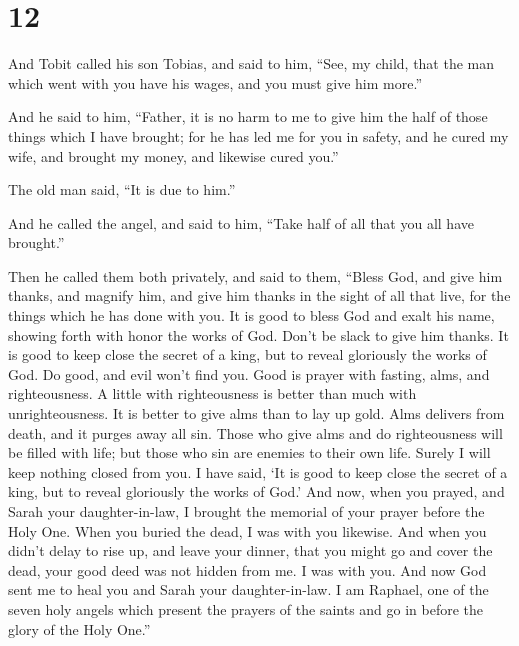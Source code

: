 \hypertarget{section-11}{%
\section{12}\label{section-11}}

 And Tobit called his son Tobias, and said to him, ``See, my
child, that the man which went with you have his wages, and you must
give him more.''

 And he said to him, ``Father, it is no harm to me to give
him the half of those things which I have brought;  for he
has led me for you in safety, and he cured my wife, and brought my
money, and likewise cured you.''

 The old man said, ``It is due to him.''

 And he called the angel, and said to him, ``Take half of
all that you all have brought.''

 Then he called them both privately, and said to them,
``Bless God, and give him thanks, and magnify him, and give him thanks
in the sight of all that live, for the things which he has done with
you. It is good to bless God and exalt his name, showing forth with
honor the works of God. Don't be slack to give him thanks. 
It is good to keep close the secret of a king, but to reveal gloriously
the works of God. Do good, and evil won't find you.  Good is
prayer with fasting, alms, and righteousness. A little with
righteousness is better than much with unrighteousness. It is better to
give alms than to lay up gold.  Alms delivers from death,
and it purges away all sin. Those who give alms and do righteousness
will be filled with life;  but those who sin are enemies to
their own life.  Surely I will keep nothing closed from
you. I have said, `It is good to keep close the secret of a king, but to
reveal gloriously the works of God.'  And now, when you
prayed, and Sarah your daughter-in-law, I brought the memorial of your
prayer before the Holy One. When you buried the dead, I was with you
likewise.  And when you didn't delay to rise up, and leave
your dinner, that you might go and cover the dead, your good deed was
not hidden from me. I was with you.  And now God sent me to
heal you and Sarah your daughter-in-law.  I am Raphael, one
of the seven holy angels which present the prayers of the saints and go
in before the glory of the Holy One.''

